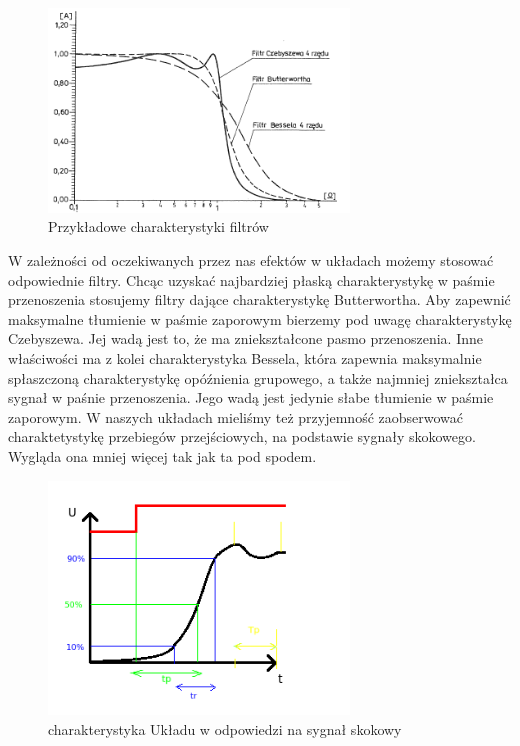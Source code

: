 \documentclass[a4paper,11pt]{article}
\begin{document}
\begin{figure} [H]
  \begin{center}
    \includegraphics[width=8cm]{charakterystyki.png}

    \caption{ Przykładowe charakterystyki filtrów }
  \end{center}
\end{figure} 

W zależności od oczekiwanych przez nas efektów w układach możemy stosować odpowiednie filtry. 
Chcąc uzyskać najbardziej płaską charakterystykę w paśmie przenoszenia stosujemy filtry dające charakterystykę Butterwortha. Aby zapewnić maksymalne tłumienie w paśmie zaporowym bierzemy pod uwagę charakterystykę Czebyszewa. Jej wadą jest to, że ma zniekształcone pasmo przenoszenia. Inne właściwości ma z kolei charakterystyka Bessela, która zapewnia maksymalnie spłaszczoną charakterystykę opóźnienia grupowego, a także najmniej zniekształca sygnał w paśnie przenoszenia. Jego wadą jest jedynie słabe tłumienie w paśmie zaporowym.  
\newline
\newline
W naszych układach mieliśmy też przyjemność zaobserwować charaktetystykę przebiegów przejściowych, na podstawie sygnały skokowego. Wygląda ona mniej więcej tak jak ta pod spodem. 

\begin{figure}[H]
\begin{center}
\includegraphics[width=8cm]{obrazki/czasy.png}
\end{center}
\caption{charakterystyka Układu w odpowiedzi na sygnał skokowy}
\end{figure}
\end{document}
